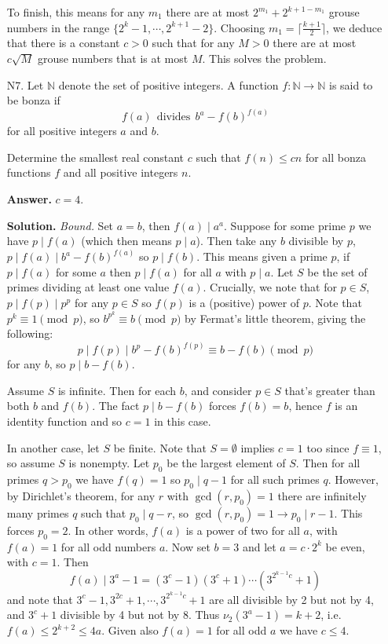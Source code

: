 \documentclass[11pt,a4paper]{article}
\begin{document}
\begin{enumerate}
    	 To finish, this means for any $m_1$ there are at most $2^{m_1} + 2^{k+1-m_1}$ grouse numbers in the range $\{2^k-1, \cdots, 2^{k+1}-2\}$. 
    	 Choosing $m_1=\lceil \frac{k+1}{2}\rceil$, we deduce that there is a constant $c > 0$ such that for any $M > 0$ there are at most $c\sqrt{M}$ grouse numbers that is at most $M$. 
    	 This solves the problem. 
    	
    	\item [N7.]
    	Let $\mathbb{N}$ denote the set of positive integers. A function $f\colon\mathbb{N}\to\mathbb{N}$ is said to be bonza if
    	\[
    	f(a)~~\text{divides}~~b^a-f(b)^{f(a)}
    	\]for all positive integers $a$ and $b$.
    	
    	Determine the smallest real constant $c$ such that $f(n)\leqslant cn$ for all bonza functions $f$ and all positive integers $n$.
    	
    	\textbf{Answer.} $c = 4$. 
    	
    	\textbf{Solution.}
    	\textit{Bound.} Set $a = b$, then $f(a)\mid a^a$. Suppose for some prime $p$ we have $p\mid f(a)$ (which then means $p\mid a$). 
    	Then take any $b$ divisible by $p$, $p\mid f(a)\mid b^a - f(b)^{f(a)}$ so $p\mid f(b)$. 
    	This means given a prime $p$, if $p\mid f(a)$ for some $a$ then $p\mid f(a)$ for all $a$ with $p\mid a$. 
    	Let $S$ be the set of primes dividing at least one value $f(a)$. 
    	Crucially, we note that for $p\in S$, $p\mid f(p)\mid p^p$ for any $p\in S$ so $f(p)$ is a (positive) power of $p$. 
    	Note that $p^k\equiv 1 \pmod{p}$, so $b^{p^k}\equiv b\pmod{p}$ by Fermat's little theorem, giving the following: 
    	\[
    	p\mid f(p) \mid b^p - f(b)^{f(p)}\equiv b - f(b)\pmod{p}
    	\]
    	for any $b$, so $p\mid b - f(b)$. 
    	
    	Assume $S$ is infinite. 
    	Then for each $b$, and consider $p\in S$ that's greater than both $b$ and $f(b)$. 
    	The fact $p\mid b - f(b)$ forces $f(b)=b$, hence $f$ is an identity function and so $c = 1$ in this case. 
    	
    	In another case, let $S$ be finite. Note that $S=\emptyset$ implies $c = 1$ too since $f\equiv 1$, 
    	so assume $S$ is nonempty. Let $p_0$ be the largest element of $S$. 
    	Then for all primes $q > p_0$ we have $f(q)=1$ so $p_0\mid q - 1$ for all such primes $q$. 
    	However, by Dirichlet's theorem, for any $r$ with $\gcd(r, p_0)=1$ there are infinitely many primes $q$ such that $p_0\mid q - r$, 
    	so $\gcd(r, p_0)=1\to p_0 \mid r - 1$. This forces $p_0 = 2$. 
    	In other words, $f(a)$ is a power of two for all $a$, with $f(a)=1$ for all odd numbers $a$. 
    	Now set $b = 3$ and let $a = c\cdot 2^k$ be even, with $c = 1$. Then 
    	\[
    	f(a) \mid 3^a - 1 = (3^c - 1)(3^c+1)\cdots (3^{2^{k-1}c}+1)
    	\]
    	and note that $3^c-1, 3^{2c}+1, \cdots, 3^{2^{k-1}c}+1$ are all divisible by 2 but not by 4, and $3^c+1$ divisible by 4 but not by 8. 
    	Thus $\nu_2(3^a-1)=k+2$, i.e. $f(a)\le 2^{k+2}\le 4a$. 
    	Given also $f(a)=1$ for all odd $a$ we have $c\le 4$. 
    	

\end{enumerate}
\end{document}
